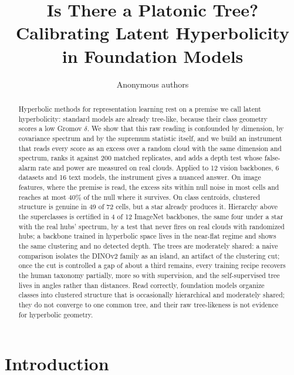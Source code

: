 \documentclass{article}
\title{Is There a Platonic Tree? \\ Calibrating Latent Hyperbolicity \\ in Foundation Models}
\author{Anonymous authors}
\begin{document}
\maketitle
\raggedbottom   %

\begin{abstract}
Hyperbolic methods for representation learning rest on a premise we call latent hyperbolicity: standard models are already tree-like, because their class geometry scores a low Gromov $\delta$. We show that this raw reading is confounded by dimension, by covariance spectrum and by the supremum statistic itself, and we build an instrument that reads every score as an excess over a random cloud with the same dimension and spectrum, ranks it against 200 matched replicates, and adds a depth test whose false-alarm rate and power are measured on real clouds. Applied to 12 vision backbones, 6 datasets and 16 text models, the instrument gives a nuanced answer. On image features, where the premise is read, the excess sits within null noise in most cells and reaches at most 40\% of the null where it survives. On class centroids, clustered structure is genuine in 49 of 72 cells, but a star already produces it. Hierarchy above the superclasses is certified in 4 of 12 ImageNet backbones, the same four under a star with the real hubs' spectrum, by a test that never fires on real clouds with randomized hubs; a backbone trained in hyperbolic space lives in the near-flat regime and shows the same clustering and no detected depth. The trees are moderately shared: a naive comparison isolates the DINOv2 family as an island, an artifact of the clustering cut; once the cut is controlled a gap of about a third remains, every training recipe recovers the human taxonomy partially, more so with supervision, and the self-supervised tree lives in angles rather than distances. Read correctly, foundation models organize classes into clustered structure that is occasionally hierarchical and moderately shared; they do not converge to one common tree, and their raw tree-likeness is not evidence for hyperbolic geometry. %
\end{abstract}

\section{Introduction}
\label{sec:introduction}
\end{document}

